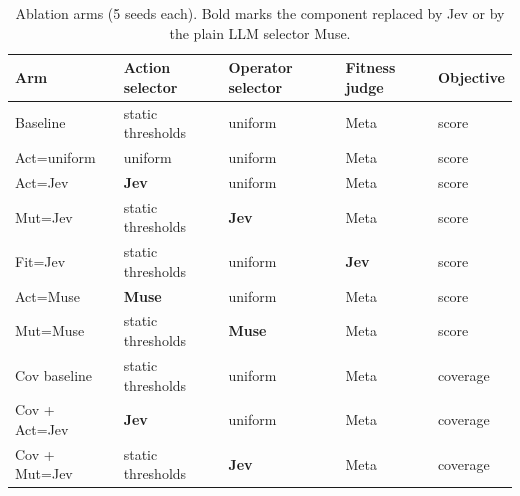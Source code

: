 \documentclass{article}
\begin{document}
\begin{table}[t]
  \caption{Ablation arms (5 seeds each). Bold marks the component replaced by Jev or by the plain LLM selector Muse.}
  \label{tab:arms}
  \centering
  \small
  \begin{tabular}{lllll}
    \toprule
    Arm & Action selector & Operator selector & Fitness judge & Objective \\
    \midrule
    Baseline & static thresholds & uniform & Meta & score \\
    Act=uniform & uniform & uniform & Meta & score \\
    Act=Jev & \textbf{Jev} & uniform & Meta & score \\
    Mut=Jev & static thresholds & \textbf{Jev} & Meta & score \\
    Fit=Jev & static thresholds & uniform & \textbf{Jev} & score \\
    Act=Muse & \textbf{Muse} & uniform & Meta & score \\
    Mut=Muse & static thresholds & \textbf{Muse} & Meta & score \\
    Cov baseline & static thresholds & uniform & Meta & coverage \\
    Cov + Act=Jev & \textbf{Jev} & uniform & Meta & coverage \\
    Cov + Mut=Jev & static thresholds & \textbf{Jev} & Meta & coverage \\
    \bottomrule
  \end{tabular}
\end{table}
\end{document}
